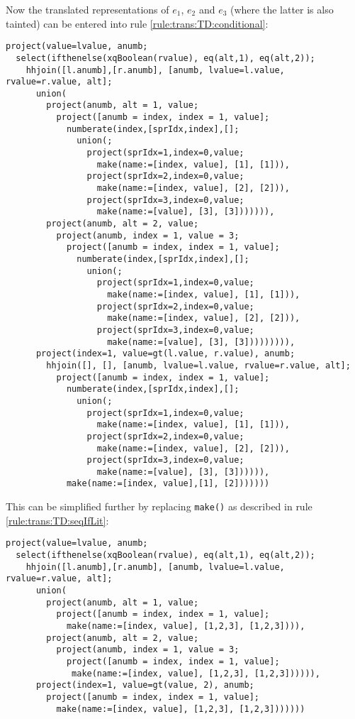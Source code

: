 Now the translated representations of $e_1$, $e_2$ and $e_3$ (where the latter
is also tainted) can be entered into rule \ref{rule:trans:TD:conditional}:

\begin{Verbatim}
project(value=lvalue, anumb;
  select(ifthenelse(xqBoolean(rvalue), eq(alt,1), eq(alt,2));
    hhjoin([l.anumb],[r.anumb], [anumb, lvalue=l.value, rvalue=r.value, alt];
      union(
        project(anumb, alt = 1, value;
          project([anumb = index, index = 1, value];
            numberate(index,[sprIdx,index],[];
              union(;
                project(sprIdx=1,index=0,value;
                  make(name:=[index, value], [1], [1])),
                project(sprIdx=2,index=0,value;
                  make(name:=[index, value], [2], [2])),
                project(sprIdx=3,index=0,value;
                  make(name:=[value], [3], [3])))))),
        project(anumb, alt = 2, value;
          project(anumb, index = 1, value = 3;
            project([anumb = index, index = 1, value];
              numberate(index,[sprIdx,index],[];
                union(;
                  project(sprIdx=1,index=0,value;
                    make(name:=[index, value], [1], [1])),
                  project(sprIdx=2,index=0,value;
                    make(name:=[index, value], [2], [2])),
                  project(sprIdx=3,index=0,value;
                    make(name:=[value], [3], [3])))))))),
      project(index=1, value=gt(l.value, r.value), anumb;
        hhjoin([], [], [anumb, lvalue=l.value, rvalue=r.value, alt];
          project([anumb = index, index = 1, value];
            numberate(index,[sprIdx,index],[];
              union(;
                project(sprIdx=1,index=0,value;
                  make(name:=[index, value], [1], [1])),
                project(sprIdx=2,index=0,value;
                  make(name:=[index, value], [2], [2])),
                project(sprIdx=3,index=0,value;
                  make(name:=[value], [3], [3]))))),
            make(name:=[index, value],[1], [2]))))))
\end{Verbatim}

This can be simplified further by replacing \texttt{make()} as described in rule \ref{rule:trans:TD:seqIfLit}: 

\begin{Verbatim}
project(value=lvalue, anumb;
  select(ifthenelse(xqBoolean(rvalue), eq(alt,1), eq(alt,2));
    hhjoin([l.anumb],[r.anumb], [anumb, lvalue=l.value, rvalue=r.value, alt];
      union(
        project(anumb, alt = 1, value;
          project([anumb = index, index = 1, value];
            make(name:=[index, value], [1,2,3], [1,2,3]))),
        project(anumb, alt = 2, value;
          project(anumb, index = 1, value = 3;
            project([anumb = index, index = 1, value];
             make(name:=[index, value], [1,2,3], [1,2,3]))))),
      project(index=1, value=gt(value, 2), anumb;
        project([anumb = index, index = 1, value];
          make(name:=[index, value], [1,2,3], [1,2,3]))))))
\end{Verbatim}

